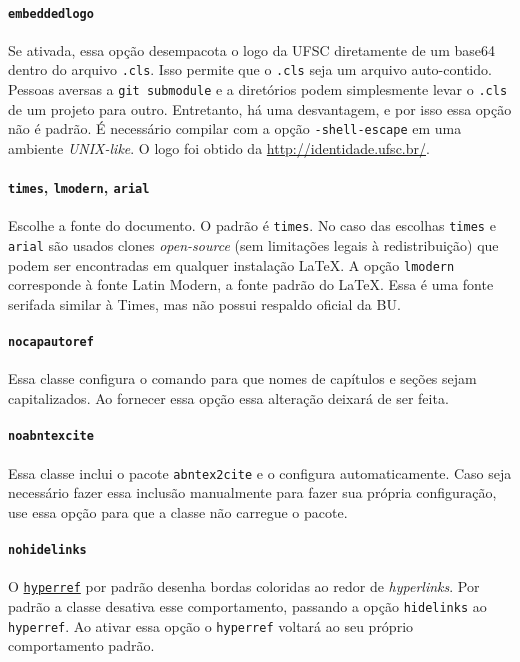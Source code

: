 \documentclass[embeddedlogo]{../ufsc-thesis-rn46-2019}
\begin{document}
\paragraph*{\texttt{embeddedlogo}} Se ativada, essa opção desempacota o logo da
UFSC diretamente de um base64 dentro do arquivo \texttt{.cls}. Isso permite que
o \texttt{.cls} seja um arquivo auto-contido. Pessoas aversas a \texttt{git
submodule} e a diretórios podem simplesmente levar o \texttt{.cls} de um
projeto para outro. Entretanto, há uma desvantagem, e por isso essa opção não é
padrão. É necessário compilar com a opção \texttt{-shell-escape} em uma
ambiente \emph{UNIX-like}. O logo foi obtido da \href{página de identidade
visual da UFSC}{http://identidade.ufsc.br/}.

\paragraph*{\texttt{times}, \texttt{lmodern}, \texttt{arial}} Escolhe a fonte
do documento. O padrão é \texttt{times}. No caso das escolhas \texttt{times} e
\texttt{arial} são usados clones \emph{open-source} (sem limitações legais à
redistribuição) que podem ser encontradas em qualquer instalação \LaTeX. A
opção \texttt{lmodern} corresponde à fonte Latin Modern, a fonte padrão do
\LaTeX. Essa é uma fonte serifada similar à Times, mas não possui respaldo
oficial da BU.

\paragraph*{\texttt{nocapautoref}} Essa classe configura o comando
\mt{\autoref} para que nomes de capítulos e seções sejam capitalizados. Ao
fornecer essa opção essa alteração deixará de ser feita.

\paragraph*{\texttt{noabntexcite}} Essa classe inclui o pacote
\texttt{abntex2cite} e o configura automaticamente. Caso seja necessário fazer
essa inclusão manualmente para fazer sua própria configuração, use essa opção
para que a classe não carregue o pacote.

\paragraph*{\texttt{nohidelinks}} O
\href{https://ctan.org/pkg/hyperref}{\texttt{hyperref}} por padrão desenha
bordas coloridas ao redor de \emph{hyperlinks}. Por padrão a classe desativa
esse comportamento, passando a opção \texttt{hidelinks} ao \texttt{hyperref}.
Ao ativar essa opção o \texttt{hyperref} voltará ao seu próprio comportamento
padrão.
\end{document}
